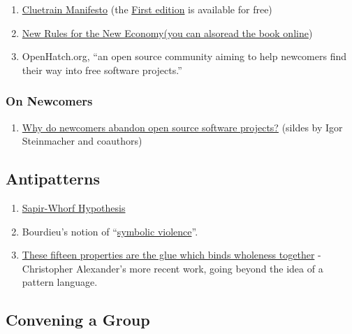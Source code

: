 \begin{enumerate}
\item
  \href{http://www.cluetrain.com}{Cluetrain Manifesto} (the
  \href{http://www.cluetrain.com/book/index.html}{First edition} is
  available for free)
\item
  \href{http://www.kk.org/newrules/contents.php}{New Rules for the New
  Economy}\href{http://www.kk.org/newrules/contents.php}{(you can
  also}\href{http://www.kk.org/newrules/contents.php}{read the book
  online})
\item
  OpenHatch.org, ``an open source community aiming to help newcomers
  find their way into free software projects.''
\end{enumerate}
\subsubsection{On Newcomers}

\begin{enumerate}
\item
  \href{http://lapessc.ime.usp.br/public/papers/13872/CHASE13\_present.pdf}{Why
  do newcomers abandon open source software projects?} (sildes by Igor
  Steinmacher and coauthors)
\end{enumerate}
\subsection{Antipatterns}

\begin{enumerate}
\item
  \href{http://en.wikipedia.org/wiki/Linguistic\_relativity}{Sapir-Whorf
  Hypothesis}
\item
  Bourdieu's notion of
  ``\href{http://en.wikipedia.org/wiki/Symbolic\_violence}{symbolic
  violence}''.
\item
  \href{http://www.livingneighborhoods.org/ht-0/fifteen.htm}{These
  fifteen properties are the glue which binds wholeness together} -
  Christopher Alexander's more recent work, going beyond the idea of a
  pattern language.
\end{enumerate}
\subsection{Convening a Group}

